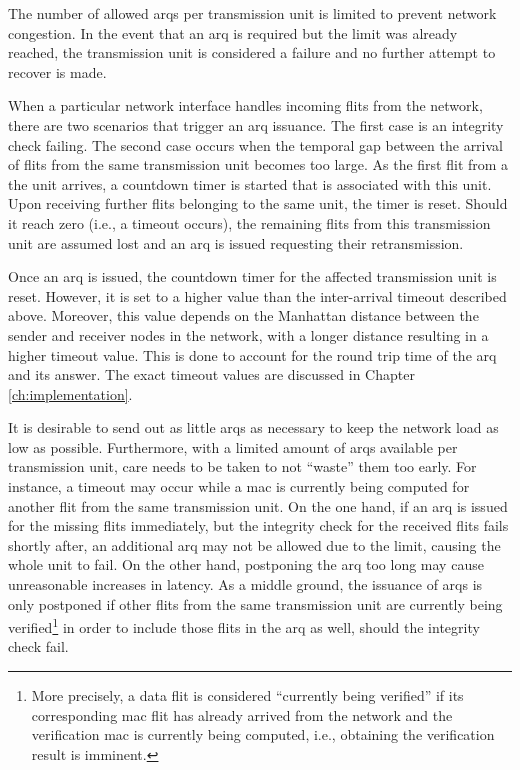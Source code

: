 The number of allowed \glspl{arq} per transmission unit is limited to prevent network congestion. In the event that an \gls{arq} is required but the limit
was already reached, the transmission unit is considered a failure and no further attempt to recover is made.

When a particular network interface handles incoming flits from the network, there are two scenarios that trigger an \gls{arq} issuance. The first
case is an integrity check failing. The second case occurs when the temporal gap between the arrival of flits from the same transmission unit becomes
too large. As the first flit from a the unit arrives, a countdown timer is started that is associated with this unit. Upon receiving further flits
belonging to the same unit, the timer is reset. Should it reach zero (i.e., a timeout occurs), the remaining flits from this transmission unit are
assumed lost and an \gls{arq} is issued requesting their retransmission.

Once an \gls{arq} is issued, the countdown timer for the affected transmission unit is reset. However, it is set to a higher value than the
inter-arrival timeout described above. Moreover, this value depends on the Manhattan distance between the sender and receiver nodes in the network,
with a longer distance resulting in a higher timeout value. This is done to account for the round trip time of the \gls{arq} and its
answer. The exact timeout values are discussed in Chapter \ref{ch:implementation}.

It is desirable to send out as little \glspl{arq} as necessary to keep the network load as low as possible. Furthermore, with a limited
amount of \glspl{arq} available per transmission unit, care needs to be taken to not \enquote{waste} them too early. For instance, a timeout may
occur while a \gls{mac} is currently being computed for another flit from the same transmission unit. On the one hand, if an \gls{arq} is issued for
the missing flits immediately, but the integrity check for the received flits fails shortly after, an additional \gls{arq} may not be allowed due to
the limit, causing the whole unit to fail. On the other hand, postponing the \gls{arq} too long may cause unreasonable increases in latency. As a
middle ground, the issuance of \glspl{arq} is only postponed if other flits from the same transmission unit are currently being verified\footnote{More
precisely, a data flit is considered \enquote{currently being verified} if its corresponding \gls{mac} flit has already arrived from the network and
the verification \gls{mac} is currently being computed, i.e., obtaining the verification result is imminent.} in order to include those flits in the
\gls{arq} as well, should the integrity check fail.

